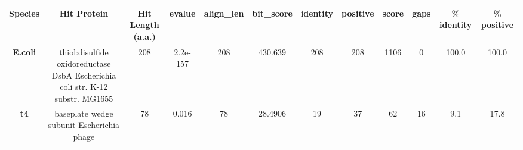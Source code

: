 \begin{tabular}{|c|c|c|c|c|c|c|c|c|c|c|c|} \hline
\textbf{Species} & \textbf{Hit Protein} & \textbf{Hit Length (a.a.)} & \textbf{evalue} & \textbf{align\_len} & \textbf{bit\_score} & \textbf{identity} & \textbf{positive} & \textbf{score} & \textbf{gaps} & \textbf{\% identity} & \textbf{\% positive} \\ \hline
\textbf{E.coli} & thiol:disulfide oxidoreductase DsbA Escherichia coli str. K-12 substr. MG1655 & 208 & 2.2e-157 & 208 & 430.639 & 208 & 208 & 1106 & 0 & 100.0 & 100.0\\
\textbf{t4} & baseplate wedge subunit Escherichia phage  & 78 & 0.016 & 78 & 28.4906 & 19 & 37 & 62 & 16 & 9.1 & 17.8\\
\hline \end{tabular}
